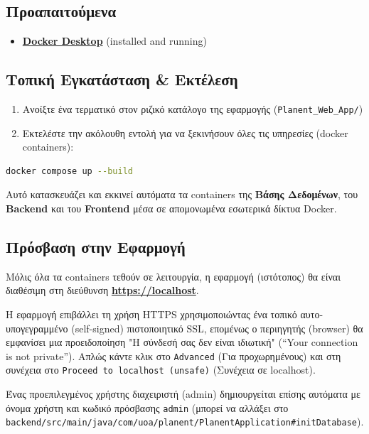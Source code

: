 \documentclass[12pt]{fphw}
\newcommand{\en}[1]{\foreignlanguage{english}{#1}}
\begin{document}
\subsection{Προαπαιτούμενα}
\begin{itemize}
    \item \textbf{\href{https://www.docker.com/products/docker-desktop/}{Docker Desktop}} (installed and running)
\end{itemize}

\subsection{Τοπική Εγκατάσταση \& Εκτέλεση}

\begin{enumerate}
    \item Ανοίξτε ένα τερματικό στον ριζικό κατάλογο της εφαρμογής (\en{\texttt{Planent\_Web\_App/}})
    \item Εκτελέστε την ακόλουθη εντολή για να ξεκινήσουν όλες τις υπηρεσίες (\en{docker containers}):
\end{enumerate}

\begin{lstlisting}[language=bash]
docker compose up --build
\end{lstlisting}
Αυτό κατασκευάζει και εκκινεί αυτόματα τα containers της \en{\textbf{Βάσης Δεδομένων}}, του \en{\textbf{Backend}} και του \en{\textbf{Frontend}} μέσα σε απομονωμένα εσωτερικά δίκτυα \en{Docker}.

\subsection{Πρόσβαση στην Εφαρμογή}

Μόλις όλα τα containers τεθούν σε λειτουργία, η εφαρμογή (ιστότοπος) θα είναι διαθέσιμη στη διεύθυνση \textbf{\href{https://localhost}{https://localhost}}.

Η εφαρμογή επιβάλλει τη χρήση HTTPS χρησιμοποιώντας ένα τοπικό αυτο-υπογεγραμμένο (self-signed) πιστοποιητικό SSL, επομένως ο περιηγητής (browser) θα εμφανίσει μια προειδοποίηση "Η σύνδεσή σας δεν είναι ιδιωτική" (``Your connection is not private''). Απλώς κάντε κλικ στο \texttt{Advanced} (Για προχωρημένους) και στη συνέχεια στο \texttt{Proceed to localhost (unsafe)} (Συνέχεια σε localhost).

Ένας προεπιλεγμένος χρήστης διαχειριστή (admin) δημιουργείται επίσης αυτόματα με όνομα χρήστη και κωδικό πρόσβασης \texttt{admin} (μπορεί να αλλάξει στο \texttt{backend/src/main/java/com/uoa/planent/PlanentApplication\#initDatabase}).
\end{document}
